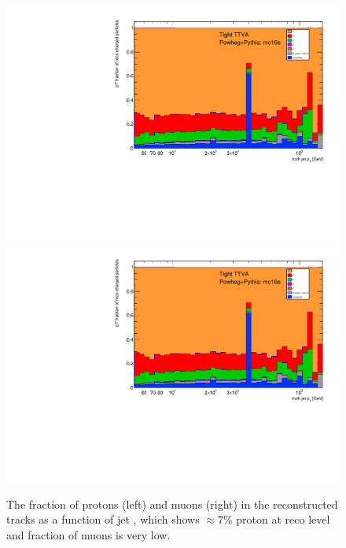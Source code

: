 \begin{figure}[b]
\centering
\includegraphics[scale=0.3, page=12]{figures/jet_comp_study_powheg_Tight_pTFraction_mc16e.pdf}
\includegraphics[scale=0.3, page=13]{figures/jet_comp_study_powheg_Tight_pTFraction_mc16e.pdf}
\caption {The fraction of protons (left) and muons (right) in the reconstructed tracks as a function of jet \pT, which shows  $\approx7$\% proton at reco level and fraction of muons is very low.}
\label{fig:protons_muons}
\end{figure}

